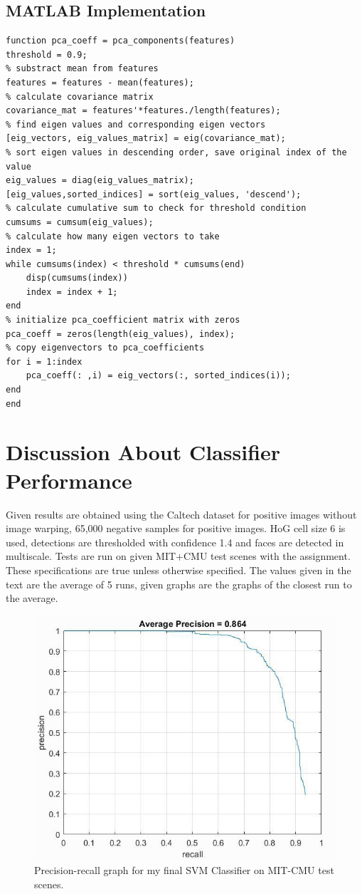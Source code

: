 \documentclass{article}
\begin{document}
\subsection{MATLAB Implementation}
\begin{lstlisting}[caption={My implementation of Detector function.},captionpos=b]
function pca_coeff = pca_components(features)
threshold = 0.9;
% substract mean from features 
features = features - mean(features);
% calculate covariance matrix
covariance_mat = features'*features./length(features);
% find eigen values and corresponding eigen vectors
[eig_vectors, eig_values_matrix] = eig(covariance_mat);
% sort eigen values in descending order, save original index of the value 
eig_values = diag(eig_values_matrix);
[eig_values,sorted_indices] = sort(eig_values, 'descend');
% calculate cumulative sum to check for threshold condition
cumsums = cumsum(eig_values);
% calculate how many eigen vectors to take
index = 1;
while cumsums(index) < threshold * cumsums(end)
    disp(cumsums(index))
    index = index + 1;
end
% initialize pca_coefficient matrix with zeros
pca_coeff = zeros(length(eig_values), index);
% copy eigenvectors to pca_coefficients
for i = 1:index
    pca_coeff(: ,i) = eig_vectors(:, sorted_indices(i));
end
end
\end{lstlisting}

\section{Discussion About Classifier Performance}
Given results are obtained using the Caltech dataset for positive images without image warping, 65,000 negative samples for positive images. HoG cell size 6 is used, detections are thresholded with confidence 1.4 and faces are detected in multiscale. Tests are run on given MIT+CMU test scenes with the assignment. These specifications are true unless otherwise specified. The values given in the text are the average of 5 runs, given graphs are the graphs of the closest run to the average.

\begin{figure}[!htb]
 \centering
  \includegraphics[width=.92\textwidth]{final.jpg}
\caption{Precision-recall graph for my final SVM Classifier on MIT-CMU test scenes.}
\end{figure}%
\end{document}
